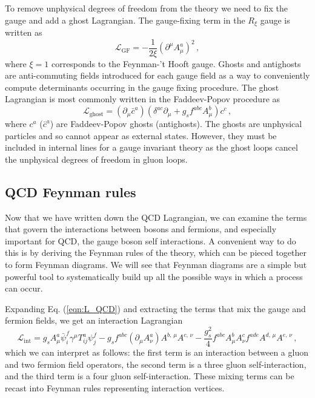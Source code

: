 \documentclass[main.tex]{subfiles}
\begin{document}
    To remove unphysical degrees of freedom from the
    theory we need to fix the gauge
    and add a ghost Lagrangian. The gauge-fixing term
    in the $R_{\xi}$ gauge is written as
    \begin{equation}\label{eqn:L_GF}
        \mathcal{L}_{\mathrm{GF}} = -\dfrac{1}{2\xi}(\partial^{\mu}A_{\mu}^{a})^{2} \, ,
    \end{equation}
    where $\xi = 1$ corresponds to the Feynman-'t Hooft gauge.
    Ghosts and antighosts are anti-commuting fields
    introduced for each gauge field as a way to conveniently compute
    determinants occurring in the gauge fixing procedure.
    The ghost Lagrangian is most commonly written
    in the Faddeev-Popov procedure as
    \begin{equation}\label{eqn:L_ghost}
        \mathcal{L}_{\mathrm{ghost}} = (\partial_{\mu}\bar{c}^{a})(\delta^{ac}\partial_{\mu} + g_{s}f^{abc}A^{b}_{\mu})c^{c} \, ,
    \end{equation}
    where $c^{a}$ ($\bar{c}^{a}$) are Faddeev-Popov ghosts (antighosts).
    The ghosts are unphysical particles and so cannot appear as
    external states. However, they must be included in internal lines for
    a gauge invariant theory as the ghost loops cancel the unphysical
    degrees of freedom in gluon loops.

    \subsection{QCD Feynman rules}\label{sec:qcd_feynman}
    Now that we have written down the QCD Lagrangian,
    we can examine the terms that govern the interactions between
    bosons and fermions, and especially
    important for QCD, the gauge boson self interactions. A convenient
    way to do this is by deriving the Feynman rules of the theory, which can be
    pieced together to form Feynman diagrams. We will see
    that Feynman diagrams are a simple but powerful tool
    to systematically build up all the possible ways in which a process
    can occur.

    Expanding Eq. (\ref{eqn:L_QCD}) and extracting the terms
    that mix the gauge and fermion fields, we get an interaction Lagrangian
    \begin{equation}\label{L_int}
        \mathcal{L}_{\mathrm{int}} = g_{s}A^{a}_{\mu}\bar{\psi}_{i}^{f}\gamma^{\mu}T^{a}_{ij}\psi_{j}^{f}-g_{s}f^{abc}(\partial_{\mu}A^{a}_{\nu})A^{b,\,\mu}A^{c,\,\nu} -\dfrac{g_{s}^{2}}{4}f^{abc}A^{b}_{\mu}A^{c}_{\nu}f^{ade}A^{d,\,\mu}A^{e,\,\nu} \, ,
    \end{equation}
    which we can interpret as follows: the first term
    is an interaction between a gluon and two fermion field operators,
    the second term is a three gluon
    self-interaction, and the third term is a four gluon
    self-interaction. These mixing terms can be recast
    into Feynman rules representing interaction vertices.
\end{document}
